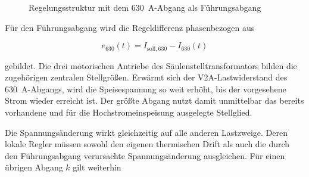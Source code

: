 \begin{figure}[H]
    \centering
    \caption{Regelungsstruktur mit dem \SI{630}{\ampere}-Abgang als
    Führungsabgang}
    \label{fig:konzept_saeulentrafo_630}
\end{figure}

Für den Führungsabgang wird die Regeldifferenz phasenbezogen aus

\begin{equation}
    e_{630}(t)
    =
    I_{\mathrm{soll},630}
    -
    I_{630}(t)
    \label{eq:konzept_regelfehler_630}
\end{equation}

gebildet. Die drei motorischen Antriebe des Säulenstelltransformators bilden
die zugehörigen zentralen Stellgrößen. Erwärmt sich der
V2A-Lastwiderstand des \SI{630}{\ampere}-Abgangs, wird die Speisespannung so
weit erhöht, bis der vorgesehene Strom wieder erreicht ist. Der größte
Abgang nutzt damit unmittelbar das bereits vorhandene und für die
Hochstromeinspeisung ausgelegte Stellglied.

Die Spannungsänderung wirkt gleichzeitig auf alle anderen Lastzweige. Deren
lokale Regler müssen sowohl den eigenen thermischen Drift als auch die durch
den Führungsabgang verursachte Spannungsänderung ausgleichen. Für einen
übrigen Abgang $k$ gilt weiterhin

